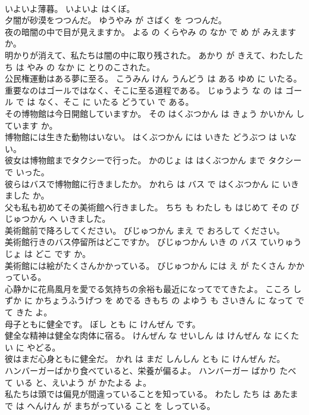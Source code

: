 \documentclass[8pt]{extreport}
\begin{document}
\begin{CJK}{UTF8}{min}
\\	いよいよ薄暮。	いよいよ はくぼ。	
\\	夕闇が砂漠をつつんだ。	ゆうやみ が さばく を つつんだ。	
\\	夜の暗闇の中で目が見えますか。	よる の くらやみ の なか で め が みえます か。	
\\	明かりが消えて、私たちは闇の中に取り残された。	あかり が きえて、わたしたち は やみ の なか に とりのこされた。	
\\	公民権運動はある夢に至る。	こうみん けん うんどう は ある ゆめ に いたる。	
\\	重要なのはゴールではなく、そこに至る道程である。	じゅうよう な の は ゴール で は なく、そこ に いたる どうてい で ある。	
\\	その博物館は今日開館していますか。	その はくぶつかん は きょう かいかん しています か。	
\\	博物館には生きた動物はいない。	はくぶつかん には いきた どうぶつ は いない。	
\\	彼女は博物館までタクシーで行った。	かのじょ は はくぶつかん まで タクシー で いった。	
\\	彼らはバスで博物館に行きましたか。	かれら は バス で はくぶつかん に いきました か。	
\\	父も私も初めてその美術館へ行きました。	ちち も わたし も はじめて その びじゅつかん へ いきました。	
\\	美術館前で降ろしてください。	びじゅつかん まえ で おろして ください。	
\\	美術館行きのバス停留所はどこですか。	びじゅつかん いき の バス ていりゅうじょ は どこ です か。	
\\	美術館には絵がたくさんかかっている。	びじゅつかん には え が たくさん かかっている。	
\\	心静かに花鳥風月を愛でる気持ちの余裕も最近になってでてきたよ。	こころ しずか に かちょうふうげつ を めでる きもち の よゆう も さいきん に なって でて きた よ。	
\\	母子ともに健全です。	ぼし とも に けんぜん です。	
\\	健全な精神は健全な肉体に宿る。	けんぜん な せいしん は けんぜん な にくたい に やどる。	
\\	彼はまだ心身ともに健全だ。	かれ は まだ しんしん とも に けんぜん だ。	
\\	ハンバーガーばかり食べていると、栄養が偏るよ。	ハンバーガー ばかり たべ て いる と、えいよう が かたよる よ。	
\\	私たちは頭では偏見が間違っていることを知っている。	わたし たち は あたま で は へんけん が まちがっている こと を しっている。	

\end{CJK}
\end{document}
